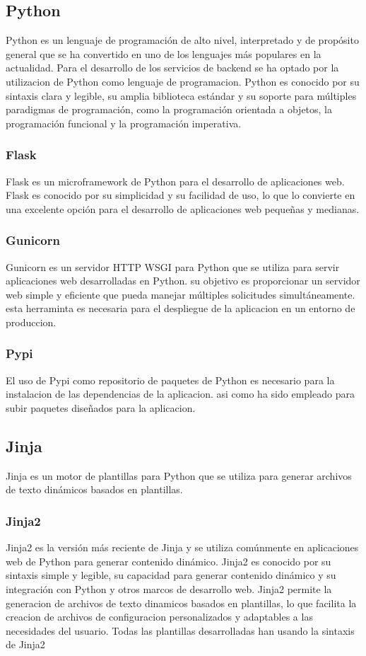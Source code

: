 \documentclass[12pt, a4paper, twoside]{article}
\begin{document}
\subsection{Python}
\cite{python}
Python es un lenguaje de programación de alto nivel, interpretado y de propósito general que se ha convertido en uno de los lenguajes más populares en la actualidad.
Para el desarrollo de los servicios de backend se ha optado por la utilizacion de Python como lenguaje de programacion.
Python es conocido por su sintaxis clara y legible, su amplia biblioteca estándar y su soporte para múltiples paradigmas de programación, como la programación orientada a objetos, la programación funcional y la programación imperativa.
\subsubsection{Flask}
\cite{flask}
Flask es un microframework de Python para el desarrollo de aplicaciones web.
Flask es conocido por su simplicidad y su facilidad de uso, lo que lo convierte en una excelente opción para el desarrollo de aplicaciones web pequeñas y medianas.
\subsubsection{Gunicorn}
\cite{gunicorn}
Gunicorn es un servidor HTTP WSGI para Python que se utiliza para servir aplicaciones web desarrolladas en Python. su objetivo es proporcionar un servidor web simple y eficiente que pueda manejar múltiples solicitudes simultáneamente.
esta herraminta es necesaria para el despliegue de la aplicacion en un entorno de produccion.
\subsubsection{Pypi}
\cite{pypi}
El uso de Pypi como repositorio de paquetes de Python es necesario para la instalacion de las dependencias de la aplicacion.
asi como ha sido empleado para subir paquetes diseñados para la aplicacion.

\subsection{Jinja}
\cite{jinja}
Jinja es un motor de plantillas para Python que se utiliza para generar archivos de texto dinámicos basados en plantillas. 

\subsubsection{Jinja2}
Jinja2 es la versión más reciente de Jinja y se utiliza comúnmente en aplicaciones web de Python para generar contenido dinámico.
Jinja2 es conocido por su sintaxis simple y legible, su capacidad para generar contenido dinámico y su integración con Python y otros marcos de desarrollo web.
Jinja2 permite la generacion de archivos de texto dinamicos basados en plantillas, lo que facilita la creacion de archivos de configuracion personalizados y adaptables a las necesidades del usuario.
Todas las plantillas desarrolladas han usando la sintaxis de Jinja2
\end{document}
